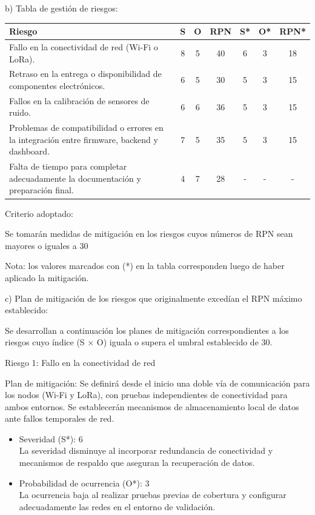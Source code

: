 \documentclass[
11pt, %
]{charter}
\begin{document}
b) Tabla de gestión de riesgos:     

\begin{table}[htpb]
\centering
\begin{tabularx}{\linewidth}{@{}|X|c|c|c|c|c|c|@{}}
\hline
\rowcolor[HTML]{C0C0C0} 
Riesgo & S & O & RPN & S* & O* & RPN* \\ \hline
Fallo en la conectividad de red (Wi-Fi o LoRa).      &  8 &  5 &  40   &  6  &  3  &   18   \\ \hline
Retraso en la entrega o disponibilidad de componentes electrónicos.       & 6  &  5 &  30   &  5  &  3  &  15    \\ \hline
Fallos en la calibración de sensores de ruido.       &  6 &  6 &   36  &  5  &  3  &   15   \\ \hline
Problemas de compatibilidad o errores en la integración entre firmware, backend y dashboard.       & 7  & 5  &  35   &  5  & 3   & 15     \\ \hline
Falta de tiempo para completar adecuadamente la documentación y preparación final.       & 4  &  7 &  28   &  -  & -   &   -   \\ \hline
\end{tabularx}%
\end{table}

Criterio adoptado: 

Se tomarán medidas de mitigación en los riesgos cuyos números de RPN sean mayores o iguales a 30

Nota: los valores marcados con (*) en la tabla corresponden luego de haber aplicado la mitigación.

c) Plan de mitigación de los riesgos que originalmente excedían el RPN máximo establecido:
 
Se desarrollan a continuación los planes de mitigación correspondientes a los riesgos cuyo índice (S × O) iguala o supera el umbral establecido de 30.

Riesgo 1: Fallo en la conectividad de red

Plan de mitigación: Se definirá desde el inicio una doble vía de comunicación para los nodos (Wi-Fi y LoRa), con pruebas independientes de conectividad para ambos entornos. Se establecerán mecanismos de almacenamiento local de datos ante fallos temporales de red.

\begin{itemize}
	\item Severidad (S*): 6\\
	La severidad disminuye al incorporar redundancia de conectividad y mecanismos de respaldo que aseguran la recuperación de datos.
	\item Probabilidad de ocurrencia (O*): 3\\
	La ocurrencia baja al realizar pruebas previas de cobertura y configurar adecuadamente las redes en el entorno de validación.
\end{itemize}
\end{document}
